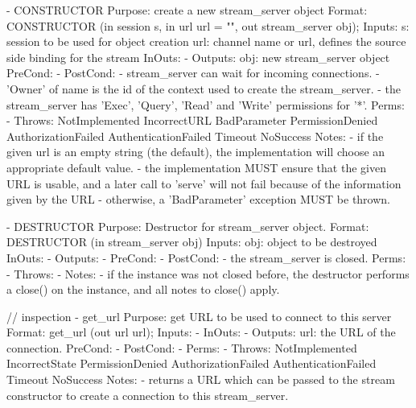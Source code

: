  
 \begin{myspec}
    - CONSTRUCTOR
      Purpose:  create a new stream_server object
      Format:   CONSTRUCTOR          (in  session   s,
                                      in  url       url = "",
                                      out stream_server obj);
      Inputs:   s:                    session to be used for
                                      object creation
                url:                  channel name or url,
                                      defines the source side
                                      binding for the stream
      InOuts:   -
      Outputs:  obj:                  new stream_server object
      PreCond:  -
      PostCond: - stream_server can wait for incoming
                  connections.
                - 'Owner' of name is the id of the context
                  used to create the stream_server.
                - the stream_server has 'Exec', 'Query', 'Read' 
                  and 'Write' permissions for '*'.
      Perms:    -
      Throws:   NotImplemented
                IncorrectURL
                BadParameter
                PermissionDenied
                AuthorizationFailed
                AuthenticationFailed
                Timeout
                NoSuccess
      Notes:    - if the given url is an empty string (the 
                  default), the implementation will choose an
                  appropriate default value.
                - the implementation MUST ensure that the given
                  URL is usable, and a later call to 'serve' 
                  will not fail because of the information given
                  by the URL - otherwise, a 'BadParameter'
                  exception MUST be thrown.
 
 
    - DESTRUCTOR
      Purpose:  Destructor for stream_server object.
      Format:   DESTRUCTOR           (in stream_server obj)
      Inputs:   obj:                  object to be destroyed
      InOuts:   -
      Outputs:  -
      PreCond:  -
      PostCond: - the stream_server is closed.
      Perms:    -
      Throws:   -
      Notes:    - if the instance was not closed before, the 
                  destructor performs a close() on the instance,
                  and all notes to close() apply.
 
    // inspection
    - get_url
      Purpose:  get URL to be used to connect to this server
      Format:   get_url              (out url       url);
      Inputs:   -
      InOuts:   -
      Outputs:  url:                  the URL of the connection.
      PreCond:  -
      PostCond: -
      Perms:    -
      Throws:   NotImplemented
                IncorrectState
                PermissionDenied
                AuthorizationFailed
                AuthenticationFailed
                Timeout
                NoSuccess
      Notes:    - returns a URL which can be passed to
                  the stream constructor to create a connection
                  to this stream_server.
      

\end{myspec}
